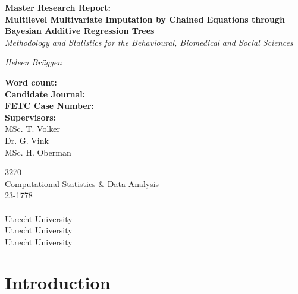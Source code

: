 \documentclass[10pt, a4paper, titlepage]{article}
\begin{document}
\begin{titlingpage}
\begin{center}
\Huge\textbf{Master Research Report:  \\ Multilevel Multivariate Imputation by Chained Equations through Bayesian Additive Regression Trees} \\
\Large\textit{Methodology and Statistics for the Behavioural, Biomedical and Social Sciences}

\vspace{.5cm}

\normalsize\textit{Heleen Brüggen}

\vspace{15cm}

\begin{minipage}{0.5\textwidth}
\begin{flushleft}

\textbf{Word count:} \\
\textbf{Candidate Journal:} \\
\textbf{FETC Case Number:} \\
\textbf{Supervisors:} \\
MSc. T. Volker \\
Dr. G. Vink \\
 MSc. H. Oberman
\end{flushleft}
\end{minipage}%
\begin{minipage}{0.5\textwidth}
\begin{flushright}

3270 \\
Computational Statistics \& Data Analysis \\
23-1778 \\
------------------------\\
Utrecht University \\
Utrecht University \\
Utrecht University
\end{flushright}
\end{minipage}

\end{center}
\end{titlingpage}

\newpage

\section{Introduction}
\end{document}
